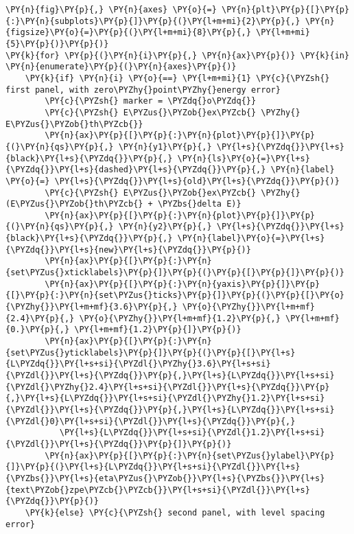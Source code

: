 \begin{Verbatim}[commandchars=\\\{\}]
\PY{n}{fig}\PY{p}{,} \PY{n}{axes} \PY{o}{=} \PY{n}{plt}\PY{p}{[}\PY{p}{:}\PY{n}{subplots}\PY{p}{]}\PY{p}{(}\PY{l+m+mi}{2}\PY{p}{,} \PY{n}{figsize}\PY{o}{=}\PY{p}{(}\PY{l+m+mi}{8}\PY{p}{,} \PY{l+m+mi}{5}\PY{p}{)}\PY{p}{)}
\PY{k}{for} \PY{p}{(}\PY{n}{i}\PY{p}{,} \PY{n}{ax}\PY{p}{)} \PY{k}{in} \PY{n}{enumerate}\PY{p}{(}\PY{n}{axes}\PY{p}{)}
    \PY{k}{if} \PY{n}{i} \PY{o}{==} \PY{l+m+mi}{1} \PY{c}{\PYZsh{} first panel, with zero\PYZhy{}point\PYZhy{}energy error}
        \PY{c}{\PYZsh{} marker = \PYZdq{}o\PYZdq{}}
        \PY{c}{\PYZsh{} E\PYZus{}\PYZob{}ex\PYZcb{} \PYZhy{} E\PYZus{}\PYZob{}th\PYZcb{}}
        \PY{n}{ax}\PY{p}{[}\PY{p}{:}\PY{n}{plot}\PY{p}{]}\PY{p}{(}\PY{n}{qs}\PY{p}{,} \PY{n}{y1}\PY{p}{,} \PY{l+s}{\PYZdq{}}\PY{l+s}{black}\PY{l+s}{\PYZdq{}}\PY{p}{,} \PY{n}{ls}\PY{o}{=}\PY{l+s}{\PYZdq{}}\PY{l+s}{dashed}\PY{l+s}{\PYZdq{}}\PY{p}{,} \PY{n}{label} \PY{o}{=} \PY{l+s}{\PYZdq{}}\PY{l+s}{old}\PY{l+s}{\PYZdq{}}\PY{p}{)}
        \PY{c}{\PYZsh{} E\PYZus{}\PYZob{}ex\PYZcb{} \PYZhy{} (E\PYZus{}\PYZob{}th\PYZcb{} + \PYZbs{}delta E)}
        \PY{n}{ax}\PY{p}{[}\PY{p}{:}\PY{n}{plot}\PY{p}{]}\PY{p}{(}\PY{n}{qs}\PY{p}{,} \PY{n}{y2}\PY{p}{,} \PY{l+s}{\PYZdq{}}\PY{l+s}{black}\PY{l+s}{\PYZdq{}}\PY{p}{,} \PY{n}{label}\PY{o}{=}\PY{l+s}{\PYZdq{}}\PY{l+s}{new}\PY{l+s}{\PYZdq{}}\PY{p}{)}
        \PY{n}{ax}\PY{p}{[}\PY{p}{:}\PY{n}{set\PYZus{}xticklabels}\PY{p}{]}\PY{p}{(}\PY{p}{[}\PY{p}{]}\PY{p}{)}
        \PY{n}{ax}\PY{p}{[}\PY{p}{:}\PY{n}{yaxis}\PY{p}{]}\PY{p}{[}\PY{p}{:}\PY{n}{set\PYZus{}ticks}\PY{p}{]}\PY{p}{(}\PY{p}{[}\PY{o}{\PYZhy{}}\PY{l+m+mf}{3.6}\PY{p}{,} \PY{o}{\PYZhy{}}\PY{l+m+mf}{2.4}\PY{p}{,} \PY{o}{\PYZhy{}}\PY{l+m+mf}{1.2}\PY{p}{,} \PY{l+m+mf}{0.}\PY{p}{,} \PY{l+m+mf}{1.2}\PY{p}{]}\PY{p}{)}
        \PY{n}{ax}\PY{p}{[}\PY{p}{:}\PY{n}{set\PYZus{}yticklabels}\PY{p}{]}\PY{p}{(}\PY{p}{[}\PY{l+s}{L\PYZdq{}}\PY{l+s+si}{\PYZdl{}\PYZhy{}3.6}\PY{l+s+si}{\PYZdl{}}\PY{l+s}{\PYZdq{}}\PY{p}{,}\PY{l+s}{L\PYZdq{}}\PY{l+s+si}{\PYZdl{}\PYZhy{}2.4}\PY{l+s+si}{\PYZdl{}}\PY{l+s}{\PYZdq{}}\PY{p}{,}\PY{l+s}{L\PYZdq{}}\PY{l+s+si}{\PYZdl{}\PYZhy{}1.2}\PY{l+s+si}{\PYZdl{}}\PY{l+s}{\PYZdq{}}\PY{p}{,}\PY{l+s}{L\PYZdq{}}\PY{l+s+si}{\PYZdl{}0}\PY{l+s+si}{\PYZdl{}}\PY{l+s}{\PYZdq{}}\PY{p}{,}
           \PY{l+s}{L\PYZdq{}}\PY{l+s+si}{\PYZdl{}1.2}\PY{l+s+si}{\PYZdl{}}\PY{l+s}{\PYZdq{}}\PY{p}{]}\PY{p}{)}
        \PY{n}{ax}\PY{p}{[}\PY{p}{:}\PY{n}{set\PYZus{}ylabel}\PY{p}{]}\PY{p}{(}\PY{l+s}{L\PYZdq{}}\PY{l+s+si}{\PYZdl{}}\PY{l+s}{\PYZbs{}}\PY{l+s}{eta\PYZus{}\PYZob{}}\PY{l+s}{\PYZbs{}}\PY{l+s}{text\PYZob{}zpe\PYZcb{}\PYZcb{}}\PY{l+s+si}{\PYZdl{}}\PY{l+s}{\PYZdq{}}\PY{p}{)}
    \PY{k}{else} \PY{c}{\PYZsh{} second panel, with level spacing error}

\end{Verbatim}
